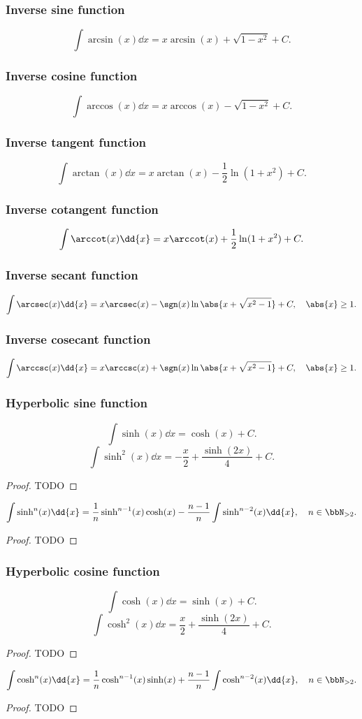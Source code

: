 \subsubsection{Inverse sine function}
\[\int\arcsin(x)\dd{x}=x\arcsin(x)+\sqrt{1-x^2}+C.\]
\subsubsection{Inverse cosine function}
\[\int\arccos(x)\dd{x}=x\arccos(x)-\sqrt{1-x^2}+C.\]
\subsubsection{Inverse tangent function}
\[\int\arctan(x)\dd{x}=x\arctan(x)-\frac{1}{2}\ln(1+x^2)+C.\]
\subsubsection{Inverse cotangent function}
\[\int\arccot(x)\dd{x}=x\arccot(x)+\frac{1}{2}\ln(1+x^2)+C.\]
\subsubsection{Inverse secant function}
\[\int\arcsec(x)\dd{x}=x\arcsec(x)-\sgn(x)\ln\abs{x+\sqrt{x^2-1}}+C,\quad\abs{x}\ge1.\]
\subsubsection{Inverse cosecant function}
\[\int\arccsc(x)\dd{x}=x\arccsc(x)+\sgn(x)\ln\abs{x+\sqrt{x^2-1}}+C,\quad\abs{x}\geq 1.\]
\subsubsection{Hyperbolic sine function}
\[\int\sinh(x)\dd{x}=\cosh(x)+C.\]
\[\int\sinh^2(x)\dd{x}=-\frac{x}{2}+\frac{\sinh(2x)}{4}+C.\]
\begin{proof}
TODO
\end{proof}
\[\int\sinh^n(x)\dd{x}=\frac{1}{n}\sinh^{n-1}(x)\cosh(x)-\frac{n-1}{n}\int\sinh^{n-2}(x)\dd{x},\quad n\in\bbN_{>2}.\]
\begin{proof}
TODO
\end{proof}
\subsubsection{Hyperbolic cosine function}
\[\int\cosh(x)\dd{x}=\sinh(x)+C.\]
\[\int\cosh^2(x)\dd{x}=\frac{x}{2}+\frac{\sinh(2x)}{4}+C.\]
\begin{proof}
TODO
\end{proof}
\[\int\cosh^n(x)\dd{x}=\frac{1}{n}\cosh^{n-1}(x)\sinh(x)+\frac{n-1}{n}\int\cosh^{n-2}(x)\dd{x},\quad n\in\bbN_{>2}.\]
\begin{proof}
TODO
\end{proof}
